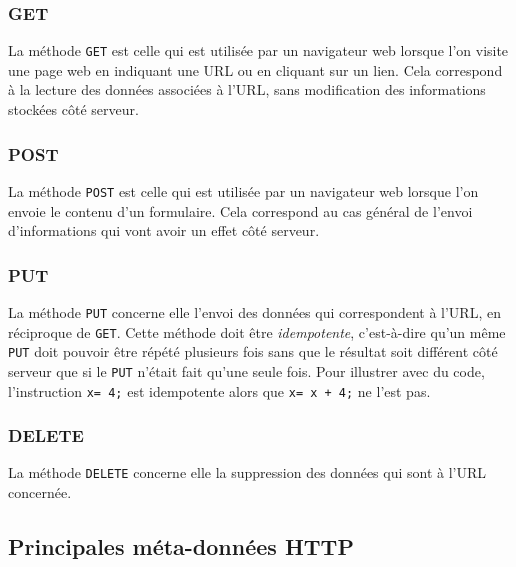 \documentclass[11pt]{article}
\begin{document}
\subsubsection{GET}
\label{sec:orgec39c94}

La méthode \texttt{GET} est celle qui est utilisée par un navigateur web lorsque l'on
visite une page web en indiquant une URL ou en cliquant sur un lien. Cela
correspond à la lecture des données associées à l'URL, sans modification des
informations stockées côté serveur.


\subsubsection{POST}
\label{sec:orga17ff40}

La méthode \texttt{POST} est celle qui est utilisée par un navigateur web lorsque l'on
envoie le contenu d'un formulaire. Cela correspond au cas général de l'envoi
d'informations qui vont avoir un effet côté serveur.

\subsubsection{PUT}
\label{sec:orgad00643}

La méthode \texttt{PUT} concerne elle l'envoi des données qui correspondent à l'URL, en
réciproque de \texttt{GET}. Cette méthode doit être \emph{idempotente}, c'est-à-dire qu'un
même \texttt{PUT} doit pouvoir être répété plusieurs fois sans que le résultat soit
différent côté serveur que si le \texttt{PUT} n'était fait qu'une seule fois. Pour
illustrer avec du code, l'instruction \texttt{x= 4;} est
idempotente alors que \texttt{x= x + 4;} ne l'est pas.

\subsubsection{DELETE}
\label{sec:orge22de11}

La méthode \texttt{DELETE} concerne elle la suppression des données qui sont à l'URL concernée.

\subsection{Principales méta-données HTTP}
\label{sec:org17f1f2b}
\end{document}
